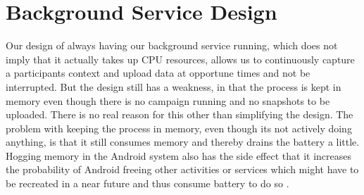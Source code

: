 
\section{Background Service Design}
\label{sec:background_service_design}

Our design of always having our background service running, which does not imply that it actually takes up CPU resources, allows us to continuously capture a participants context and upload data at opportune times and not be interrupted. But the design still has a weakness, in that the process is kept in memory even though there is no campaign running and no snapshots to be uploaded. There is no real reason for this other than simplifying the design. The problem with keeping the process in memory, even though its not actively doing anything, is that it still consumes memory and thereby drains the battery a little. Hogging memory in the Android system also has the side effect that it increases the probability of Android freeing other activities or services which might have to be recreated in a near future and thus consume battery to do so \parencite{android_memory_management}.
